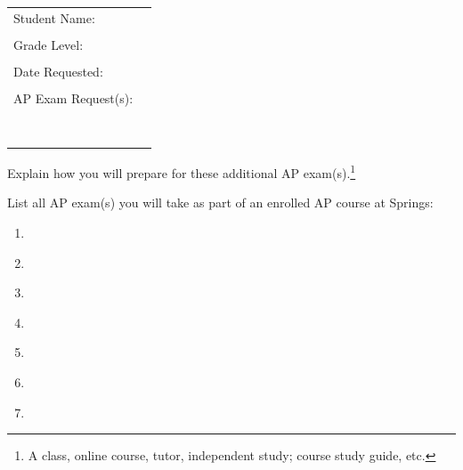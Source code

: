 \begin{tabular}{ll}
Student Name: & \underline{\hspace{7cm}}\\
&\\
Grade Level:  & \underline{\hspace{7cm}}\\
&\\
Date Requested: &  \underline{\hspace{7cm}}\\
&\\
AP Exam Request(s): & \underline{\hspace{7cm}}\\
&\\
& \underline{\hspace{7cm}}\\
&\\
& \underline{\hspace{7cm}}\\
&\\
& \underline{\hspace{7cm}}\\
&\\
& \underline{\hspace{7cm}}
\end{tabular}

\vspace{1cm}

\noindent Explain how you will prepare for these additional AP exam(s).\footnote{A class, online course, tutor, independent study; course study guide, etc.}








\vspace{4cm}
\noindent List all AP exam(s) you will take as part of an enrolled AP course at Springs:

\vspace{.25cm}
\begin{enumerate}
  \item \underline{\hspace{9cm}}
  \item \underline{\hspace{9cm}}
    \item \underline{\hspace{9cm}}
  \item \underline{\hspace{9cm}}
  \item \underline{\hspace{9cm}}
  \item \underline{\hspace{9cm}}
  \item \underline{\hspace{9cm}}            
\end{enumerate}






















